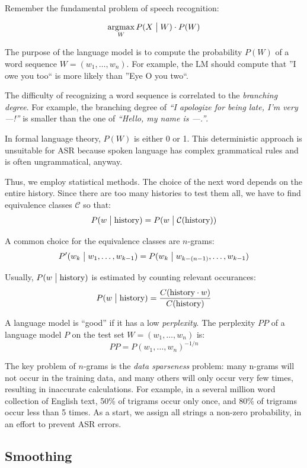 \documentclass[11pt]{article}
\DeclareMathOperator*{\argmax}{\arg\!\max}
\begin{document}
Remember the fundamental problem of speech recognition:

\[
    \argmax_W P(X \bigm| W) \cdot P(W)
\]

The purpose of the language model is to compute the probability $P(W)$ of a word sequence $W = (w_1, \ldots, w_n)$. For example, the LM should compute that ''I owe you too`` is more likely than ''Eye O you two``.

The difficulty of recognizing a word sequence is correlated to the \textit{branching degree}. For example, the branching degree of \textit{``I apologize for being late, I'm very ---!''} is smaller than the one of \textit{``Hello, my name is ---.''}.

In formal language theory, $P(W)$ is either 0 or 1. This deterministic approach is unsuitable for ASR because spoken language has complex grammatical rules and is often ungrammatical, anyway.

Thus, we employ statistical methods. The choice of the next word depends on the entire history. Since there are too many histories to test them all, we have to find equivalence classes $\mathcal{C}$ so that:
\[
    P(w \bigm| \mbox{history}) = P(w \bigm| \mathcal{C}(\mbox{history}))
\]

A common choice for the equivalence classes are $n$-grams:
\[
    P'(w_k \bigm| w_1, \ldots, w_{k-1}) = P(w_k \bigm| w_{k - (n - 1)}, \ldots, w_{k-1})
\]

Usually, $P(w \bigm| \mbox{history})$ is estimated by counting relevant occurances:
\[
    P(w \bigm| \mbox{history}) = \frac{C(\mbox{history} \cdot w)}{C(\mbox{history})}
\]

A language model is ``good'' if it has a low \textit{perplexity}. The perplexity $PP$ of a language model $P$ on the test set $W = (w_1, \ldots, w_n)$ is:
\[
    PP = P(w_1, \ldots, w_n)^{-1/n}
\]

The key problem of $n$-grams is the \textit{data sparseness} problem: many n-grams will not occur in the training data, and many others will only occur very few times, resulting in inaccurate calculations. For example, in a several million word collection of English text, 50\% of trigrams occur only once, and 80\% of trigrams occur less than 5 times. As a start, we assign all strings a non-zero probability, in an effort to prevent ASR errors.

\subsection{Smoothing}
\end{document}

